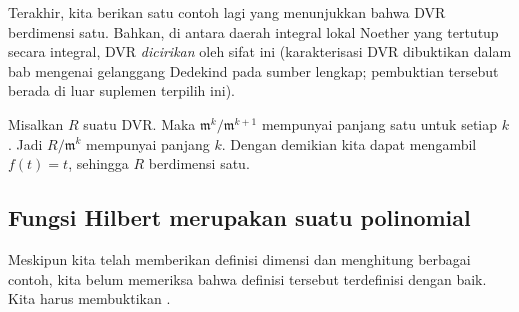Terakhir, kita berikan satu contoh lagi yang menunjukkan bahwa DVR berdimensi satu. Bahkan,
di antara daerah integral lokal Noether yang tertutup secara integral, DVR
\emph{dicirikan} oleh sifat ini (karakterisasi DVR dibuktikan dalam bab mengenai gelanggang Dedekind pada sumber lengkap; pembuktian tersebut berada di luar suplemen terpilih ini).

\begin{example}
Misalkan $R$ suatu DVR. Maka $\mathfrak{m}^k/\mathfrak{m}^{k+1}$ mempunyai panjang satu untuk
setiap $k$. Jadi $R/\mathfrak{m}^k$ mempunyai panjang $k$. Dengan demikian kita dapat mengambil $f(t) = t$, sehingga
$R$ berdimensi satu.
\end{example} 

\subsection{Fungsi Hilbert merupakan suatu polinomial} 

Meskipun kita telah memberikan definisi dimensi dan menghitung berbagai contoh,
kita belum memeriksa bahwa definisi tersebut terdefinisi dengan baik. 
Kita harus membuktikan .

